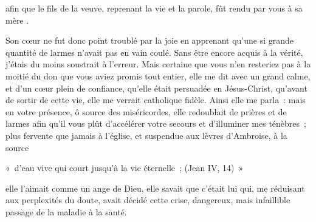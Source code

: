 \documentclass[french,twoside]{book} %
\newenvironment{quoteblock}%
  {\begin{quoting}}
  {\end{quoting}}
\newenvironment{quotebar}{%
    \def\FrameCommand{{\color{rubric!10!}\vrule width 0.5em} \hspace{0.9em}}%
    \def\OuterFrameSep{\itemsep} %
    \MakeFramed {\advance\hsize-\width \FrameRestore}
  }%
  {%
    \endMakeFramed
  }
\renewenvironment{quoteblock}%
  {%
    \savenotes
    \setstretch{0.9}
    \normalfont
    \begin{quotebar}
  }
  {%
    \end{quotebar}
    \spewnotes
  }
\begin{document}
\noindent afin que le fils de la veuve, reprenant la vie et la parole, fût rendu par vous à sa mère .\par
Son cœur ne fut donc point troublé par la joie en apprenant qu’une si grande quantité de larmes n’avait pas en vain coulé. Sans être encore acquis à la vérité, j’étais du moins soustrait à l’erreur. Mais certaine que vous n’en resteriez pas à la moitié du don que vous aviez promis tout entier, elle me dit avec un grand calme, et d’un cœur plein de confiance, qu’elle était persuadée en Jésus-Christ, qu’avant de sortir de cette vie, elle me verrait catholique fidèle. Ainsi elle me parla : mais en votre présence, ô source des miséricordes, elle redoublait de prières et de larmes afin qu’il vous plût d’accélérer votre secours et d’illuminer mes ténèbres ; plus fervente que jamais à l’église, et suspendue aux lèvres d’Ambroise, à la source\par

\begin{quoteblock}
\noindent « d’eau vive qui court jusqu’à la vie éternelle ; (Jean IV, 14) »\end{quoteblock}

\noindent elle l’aimait comme un ange de Dieu, elle savait que c’était lui qui, me réduisant aux perplexités du doute, avait décidé cette crise, dangereux, mais infaillible passage de la maladie à la santé.
\end{document}
